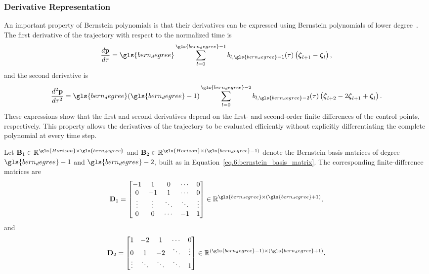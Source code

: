 \subsubsection{Derivative Representation}

An important property of Bernstein polynomials is that their derivatives can be expressed using Bernstein polynomials of lower degree~\cite{farin2002,farouki1988}. The first derivative of the trajectory with respect to the normalized time is
\begin{equation}
    \frac{d\mathbf{p}}{d\tau}
    =
    \gls{bern_degree}\sum_{l=0}^{\gls{bern_degree}-1}
    b_{l,\gls{bern_degree}-1}(\tau)
    \left(\boldsymbol{\zeta}_{l+1}-\boldsymbol{\zeta}_l\right),
    \label{eq.6:bernstein_first_derivative}
\end{equation}
and the second derivative is
\begin{equation}
    \frac{d^2\mathbf{p}}{d\tau^2}
    =
    \gls{bern_degree}(\gls{bern_degree}-1)\sum_{l=0}^{\gls{bern_degree}-2}
    b_{l,\gls{bern_degree}-2}(\tau)
    \left(\boldsymbol{\zeta}_{l+2}-2\boldsymbol{\zeta}_{l+1}+\boldsymbol{\zeta}_l\right).
    \label{eq.6:bernstein_second_derivative}
\end{equation}
These expressions show that the first and second derivatives depend on the first- and second-order finite differences of the control points, respectively. This property allows the derivatives of the trajectory to be evaluated efficiently without explicitly differentiating the complete polynomial at every time step.

Let $\mathbf{B}_1\in\mathbb{R}^{\gls{Horizon}\times \gls{bern_degree}}$ and $\mathbf{B}_2\in\mathbb{R}^{\gls{Horizon}\times(\gls{bern_degree}-1)}$ denote the Bernstein basis matrices of degree $\gls{bern_degree}-1$ and $\gls{bern_degree}-2$, built as in Equation~\eqref{eq.6:bernstein_basis_matrix}. The corresponding finite-difference matrices are
\begin{equation}
    \mathbf{D}_1 =
    \begin{bmatrix}
        -1 & 1 & 0 & \cdots & 0 \\
        0 & -1 & 1 & \cdots & 0 \\
        \vdots & \vdots & \ddots & \ddots & \vdots \\
        0 & 0 & \cdots & -1 & 1
    \end{bmatrix}
    \in\mathbb{R}^{\gls{bern_degree}\times(\gls{bern_degree}+1)},
    \label{eq.6:first_difference_matrix}
\end{equation}
and
\begin{equation}
    \mathbf{D}_2 =
    \begin{bmatrix}
        1 & -2 & 1 & \cdots & 0 \\
        0 & 1 & -2 & \ddots & \vdots \\
        \vdots & \ddots & \ddots & \ddots & 1
    \end{bmatrix}
    \in\mathbb{R}^{(\gls{bern_degree}-1)\times(\gls{bern_degree}+1)}.
    \label{eq.6:second_difference_matrix}
\end{equation}


